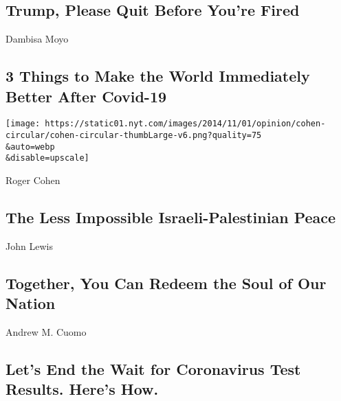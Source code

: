 \hypertarget{trump-please-quit-before-youre-fired}{%
\subsection{Trump, Please Quit Before You're
Fired}\label{trump-please-quit-before-youre-fired}}

\href{/2020/07/31/opinion/coronavirus-economy.html}{}

Dambisa Moyo

\hypertarget{3-things-to-make-the-world-immediately-better-after-covid-19}{%
\subsection{3 Things to Make the World Immediately Better After
Covid-19}\label{3-things-to-make-the-world-immediately-better-after-covid-19}}

\href{/2020/07/31/opinion/israeli-palestinian-peace.html}{}

\texttt{[image: https://static01.nyt.com/images/2014/11/01/opinion/cohen-circular/cohen-circular-thumbLarge-v6.png?quality=75\\\&auto=webp\\\&disable=upscale]}

Roger Cohen

\hypertarget{the-less-impossible-israeli-palestinian-peace}{%
\subsection{The Less Impossible Israeli-Palestinian
Peace}\label{the-less-impossible-israeli-palestinian-peace}}

\href{/2020/07/30/opinion/john-lewis-civil-rights-america.html}{}

John Lewis

\hypertarget{together-you-can-redeem-the-soul-of-our-nation}{%
\subsection{Together, You Can Redeem the Soul of Our
Nation}\label{together-you-can-redeem-the-soul-of-our-nation}}

\href{/2020/07/31/opinion/coronavirus-testing-cuomo.html}{}

Andrew M. Cuomo

\hypertarget{lets-end-the-wait-for-coronavirus-test-results-heres-how}{%
\subsection{Let's End the Wait for Coronavirus Test Results. Here's
How.}\label{lets-end-the-wait-for-coronavirus-test-results-heres-how}}


